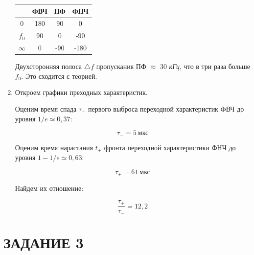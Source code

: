 \documentclass[a4paper, 12pt]{article}%
\begin{document}
\begin{enumerate}
\begin{center}
\begin{tabular}{|c|c|c|c|}
\hline 
 & ФВЧ & ПФ & ФНЧ \\ 
\hline 
0 & 180 & 90 & 0 \\ 
\hline 
$f_0$ & 90 & 0 & -90 \\ 
\hline 
$\infty$ & 0 & -90 & -180 \\ 
\hline 
\end{tabular} 
\end{center}

Двухсторонняя полоса $\triangle f$ пропускания ПФ $\approx$ 30 \textit{кГц}, что в три раза больше $f_0$. Это сходится с теорией.

\item Откроем графики преходных характеристик.

Оценим время спада $\tau_-$ первого выброса переходной характеристик ФВЧ до уровня $1/e \simeq 0,37$:

\[\tau_-= 5 \: \textit{мкс}\]

Оценим время нарастания $t_+$ фронта переходной характеристики ФНЧ до уровня $1 - 1/e \simeq 0,63$:

\[\tau_+ = 61 \: \textit{мкс}\]

Найдем их отношение:

\[\frac{\tau_+}{\tau_-} = 12,2\]

\end{enumerate}

\section*{ЗАДАНИЕ 3}
\end{document}
